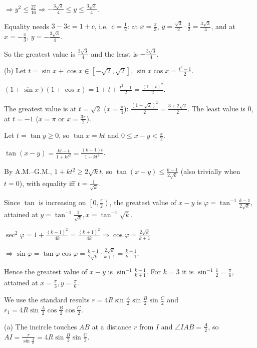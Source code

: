   $\Rightarrow y^2\le\frac{27}{16}\Rightarrow -\frac{3\sqrt{3}}{4}\le y\le\frac{3\sqrt{3}}{4}$.

  Equality needs $3 - 3c = 1 + c$, i.e.\ $c = \frac{1}{2}$: at $x = \frac{\pi}{3}$, $y = \frac{\sqrt{3}}{2}\cdot
  \frac{3}{2} = \frac{3\sqrt{3}}{4}$, and at $x = -\frac{\pi}{3}$, $y = -\frac{3\sqrt{3}}{4}$.

  So the greatest value is $\frac{3\sqrt{3}}{4}$ and the least is $-\frac{3\sqrt{3}}{4}$.

  (b) Let $t = \sin x + \cos x\in\left[-\sqrt{2}, \sqrt{2}\right]$, $\sin x\cos x = \frac{t^2 - 1}{2}$.

  $(1 + \sin x)(1 + \cos x) = 1 + t + \frac{t^2 - 1}{2} = \frac{(1 + t)^2}{2}$.

  The greatest value is at $t = \sqrt{2}$ ($x = \frac{\pi}{4}$): $\frac{\left(1 + \sqrt{2}\right)^2}{2} = \frac{3 +
  2\sqrt{2}}{2}$. The least value is $0$, at $t = -1$ ($x = \pi$ or $x = \frac{3\pi}{2}$).
\item Let $t = \tan y\ge 0$, so $\tan x = kt$ and $0\le x - y < \frac{\pi}{2}$.

  $\tan(x - y) = \frac{kt - t}{1 + kt^2} = \frac{(k - 1)t}{1 + kt^2}$.

  By A.M.--G.M., $1 + kt^2\ge 2\sqrt{k}t$, so $\tan(x - y)\le\frac{k - 1}{2\sqrt{k}}$ (also trivially when $t = 0$),
  with equality iff $t = \frac{1}{\sqrt{k}}$.

  Since $\tan$ is increasing on $\left[0, \frac{\pi}{2}\right)$, the greatest value of $x - y$ is $\varphi =
  \tan^{-1}\frac{k - 1}{2\sqrt{k}}$, attained at $y = \tan^{-1}\frac{1}{\sqrt{k}}, x = \tan^{-1}\sqrt{k}$.

  $\sec^2\varphi = 1 + \frac{(k - 1)^2}{4k} = \frac{(k + 1)^2}{4k}\Rightarrow\cos\varphi = \frac{2\sqrt{k}}{k +
  1}$

  $\Rightarrow\sin\varphi = \tan\varphi\cos\varphi = \frac{k - 1}{2\sqrt{k}}\cdot\frac{2\sqrt{k}}{k + 1} = \frac{k -
  1}{k + 1}$.

  Hence the greatest value of $x - y$ is $\sin^{-1}\frac{k - 1}{k + 1}$. For $k = 3$ it is $\sin^{-1}\frac{1}{2} =
  \frac{\pi}{6}$, attained at $x = \frac{\pi}{3}, y = \frac{\pi}{6}$.
\item We use the standard results $r = 4R\sin\frac{A}{2}\sin\frac{B}{2}\sin\frac{C}{2}$ and $r_1 =
  4R\sin\frac{A}{2}\cos\frac{B}{2}\cos\frac{C}{2}$.

  (a) The incircle touches $AB$ at a distance $r$ from $I$ and $\angle IAB = \frac{A}{2}$, so $AI =
  \frac{r}{\sin\frac{A}{2}} = 4R\sin\frac{B}{2}\sin\frac{C}{2}$.

